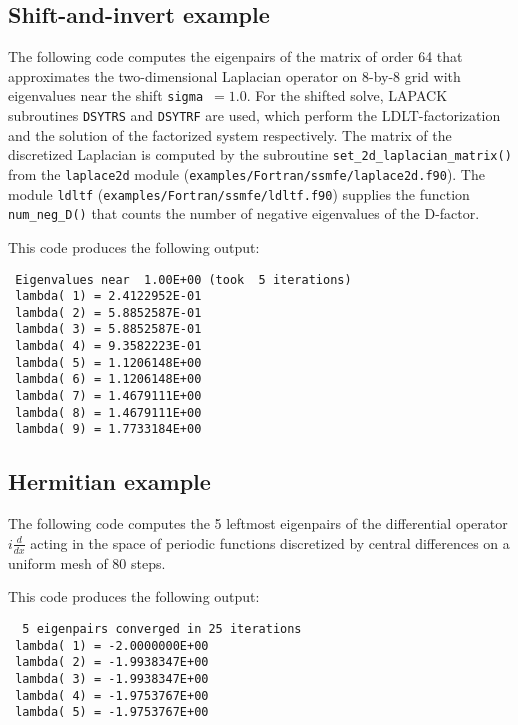 \subsection{Shift-and-invert example}
\label{sec:ex.si}

The following code 
computes the eigenpairs of 
the matrix of order 64 that approximates 
the two-dimensional Laplacian operator
on 8-by-8 grid
with eigenvalues near the shift {\tt sigma $=1.0$}.
For the shifted solve, LAPACK subroutines {\tt DSYTRS} and
{\tt DSYTRF} are used,
which perform the LDLT-factorization and
the solution of the factorized system respectively.
The matrix of the discretized Laplacian is computed
by the subroutine {\tt set\_2d\_laplacian\_matrix()}
from the {\tt laplace2d} module (\texttt{examples/Fortran/ssmfe/laplace2d.f90}).
The module {\tt ldltf} (\texttt{examples/Fortran/ssmfe/ldltf.f90}) supplies
the function {\tt num\_neg\_D()}
that counts the number of negative eigenvalues of
the D-factor.

This code produces the following output:
\begin{verbatim}
 Eigenvalues near  1.00E+00 (took  5 iterations)
 lambda( 1) = 2.4122952E-01
 lambda( 2) = 5.8852587E-01
 lambda( 3) = 5.8852587E-01
 lambda( 4) = 9.3582223E-01
 lambda( 5) = 1.1206148E+00
 lambda( 6) = 1.1206148E+00
 lambda( 7) = 1.4679111E+00
 lambda( 8) = 1.4679111E+00
 lambda( 9) = 1.7733184E+00
\end{verbatim}

\subsection{Hermitian example}
\label{sec:ex.h}

The following code 
computes the 5 leftmost eigenpairs of 
the differential operator $i \frac{d}{dx}$
acting in the space of periodic functions
discretized by central differences on a uniform mesh
of 80 steps.

This code produces the following output:
\begin{verbatim}
  5 eigenpairs converged in 25 iterations
 lambda( 1) = -2.0000000E+00
 lambda( 2) = -1.9938347E+00
 lambda( 3) = -1.9938347E+00
 lambda( 4) = -1.9753767E+00
 lambda( 5) = -1.9753767E+00
\end{verbatim}
